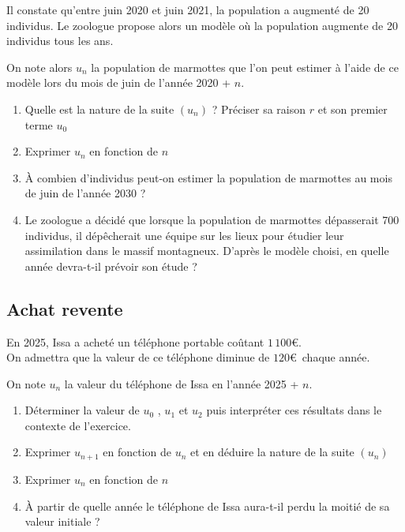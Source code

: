 \documentclass[oneside,12pt]{article}          %
\begin{document}
Il constate qu’entre juin 2020 et juin 2021, la population a augmenté de 20 individus. Le zoologue propose alors un modèle où la population augmente de 20 individus tous les ans.

On note alors $u_n$ la population de marmottes que l’on peut estimer à l’aide de ce modèle lors du mois de juin de l'année 2020 + $n$.
\begin{enumerate}
	\item Quelle est la nature de la suite $(u_n)$ ? Préciser sa raison $r$ et son premier terme $u_0$
	\item Exprimer $u_n$ en fonction de $n$
	\item À combien d'individus peut-on estimer la population de marmottes au mois de juin de l'année 2030 ?
	\item Le zoologue a décidé que lorsque la population de marmottes dépasserait 700 individus, il dépêcherait une équipe sur les lieux pour étudier leur assimilation dans le massif montagneux. D'après le modèle choisi, en quelle année devra-t-il prévoir son étude ?
\end{enumerate}



\subsection{Achat revente}
En 2025, Issa a acheté un téléphone portable coûtant $1\,100$\euro.\\
On admettra que la valeur de ce téléphone diminue de $120$\euro\, chaque année.

On note $u_n$ la valeur du téléphone de Issa en l'année 2025 + $n$.
\begin{enumerate}
	\item Déterminer la valeur de $u_0$ , $u_1$ et $u_2$ puis interpréter ces résultats dans le contexte de l'exercice.
	\item Exprimer $u_{n+1}$ en fonction de $u_n$ et en déduire la nature de la suite $(u_n)$
	\item Exprimer $u_n$ en fonction de $n$
	\item À partir de quelle année le téléphone de Issa aura-t-il perdu la moitié de sa valeur initiale ?
\end{enumerate}
\end{document}
